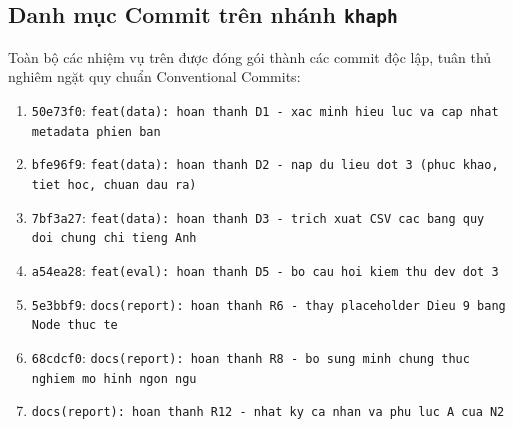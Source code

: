 \subsection{Danh mục Commit trên nhánh \texttt{khaph}}

Toàn bộ các nhiệm vụ trên được đóng gói thành các commit độc lập, tuân thủ nghiêm ngặt quy chuẩn Conventional Commits:
\begin{enumerate}
  \item \texttt{50e73f0}: \texttt{feat(data): hoan thanh D1 - xac minh hieu luc va cap nhat metadata phien ban}
  \item \texttt{bfe96f9}: \texttt{feat(data): hoan thanh D2 - nap du lieu dot 3 (phuc khao, tiet hoc, chuan dau ra)}
  \item \texttt{7bf3a27}: \texttt{feat(data): hoan thanh D3 - trich xuat CSV cac bang quy doi chung chi tieng Anh}
  \item \texttt{a54ea28}: \texttt{feat(eval): hoan thanh D5 - bo cau hoi kiem thu dev dot 3}
  \item \texttt{5e3bbf9}: \texttt{docs(report): hoan thanh R6 - thay placeholder Dieu 9 bang Node thuc te}
  \item \texttt{68cdcf0}: \texttt{docs(report): hoan thanh R8 - bo sung minh chung thuc nghiem mo hinh ngon ngu}
  \item \texttt{docs(report): hoan thanh R12 - nhat ky ca nhan va phu luc A cua N2}
\end{enumerate}
